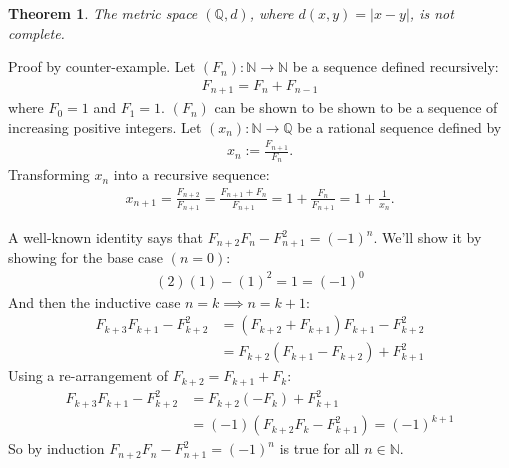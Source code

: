 \documentclass{amsart}
\numberwithin{equation}{section}
\let\oldendproof\endproof
\renewenvironment{proof}[1][\proofname]{%
  \setcounter{case}{0}
  \setcounter{step}{0}
  \oldproof[#1]%
}{\oldendproof}
\theoremstyle{plain}
\newtheorem{theorem}{Theorem}[section]
\theoremstyle{definition}
\theoremstyle{remark}
\begin{document}
\begin{theorem}
  The metric space $(\mathbb{Q},d)$, where $d(x,y) = |x-y|$, is not complete.
\end{theorem}
\begin{proof}
  Proof by counter-example. Let $(F_n):\mathbb{N}\to\mathbb{N}$ be a sequence defined recursively:
  \begin{align*}
    F_{n+1} = F_n + F_{n-1}
  \end{align*}
  where $F_0=1$ and $F_1=1$. $(F_n)$ can be shown to be shown to be a sequence of increasing positive integers. Let $(x_n):\mathbb{N} \to \mathbb{Q}$ be a rational sequence defined by
  \begin{align*}
    x_n := \frac{F_{n+1}}{F_n}.
  \end{align*}
  Transforming $x_n$ into a recursive sequence:
  \begin{align*}
    x_{n+1} = \frac{F_{n+2}}{F_{n+1}} = \frac{F_{n+1}+F_n}{F_{n+1}} = 1 + \frac{F_n}{F_{n+1}} = 1+\frac{1}{x_n}.
  \end{align*}

  \step A well-known identity says that $F_{n+2}F_n-F_{n+1}^2=(-1)^n$. We'll show it by showing for the base case $(n=0)$:
  \begin{align*}
    (2)(1)-(1)^2=1=(-1)^0
  \end{align*}
  And then the inductive case $n=k \implies n=k+1$:
  \begin{align*}
    F_{k+3}F_{k+1}-F_{k+2}^2 &= (F_{k+2}+F_{k+1})F_{k+1}-F_{k+2}^2 \\
    &=F_{k+2}(F_{k+1}-F_{k+2})+F_{k+1}^2
  \end{align*}
  Using a re-arrangement of $F_{k+2}=F_{k+1}+F_k$:
  \begin{align*}
    F_{k+3}F_{k+1}-F_{k+2}^2 &= F_{k+2}(-F_k)+F_{k+1}^2\\
    &= (-1)(F_{k+2}F_k-F_{k+1}^2) = (-1)^{k+1}
  \end{align*}
  So by induction $F_{n+2}F_n-F_{n+1}^2=(-1)^n$ is true for all $n \in \mathbb{N}$.


\end{proof}
\end{document}
